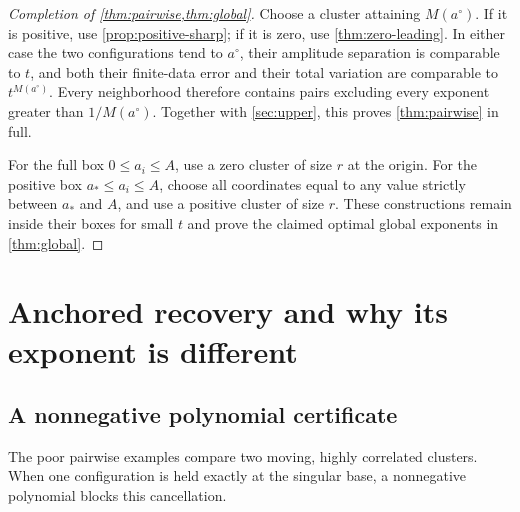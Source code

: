 \documentclass[11pt,a4paper]{article}
\numberwithin{equation}{section}
\theoremstyle{definition}
\theoremstyle{remark}
\newcommand{\base}{a^{\circ}}
\begin{document}
\begin{proof}[Completion of \cref{thm:pairwise,thm:global}]
Choose a cluster attaining $M(\base)$.  If it is positive, use
\cref{prop:positive-sharp}; if it is zero, use \cref{thm:zero-leading}.  In either
case the two configurations tend to $\base$, their amplitude separation is
comparable to $t$, and both their finite-data error and their total variation
are comparable to $t^{M(\base)}$.  Every neighborhood therefore contains pairs
excluding every exponent greater than $1/M(\base)$.  Together with
\cref{sec:upper}, this proves \cref{thm:pairwise} in full.

For the full box $0\le a_i\le A$, use a zero cluster of size $r$ at the origin.
For the positive box $a_*\le a_i\le A$, choose all coordinates equal to any
value strictly between $a_*$ and $A$, and use a positive cluster of size $r$.
These constructions remain inside their boxes for small $t$ and prove the
claimed optimal global exponents in \cref{thm:global}.
\end{proof}

\section{Anchored recovery and why its exponent is different}
\label{sec:anchored}

\subsection{A nonnegative polynomial certificate}
The poor pairwise examples compare two moving, highly correlated clusters.
When one configuration is held exactly at the singular base, a nonnegative
polynomial blocks this cancellation.
\end{document}
